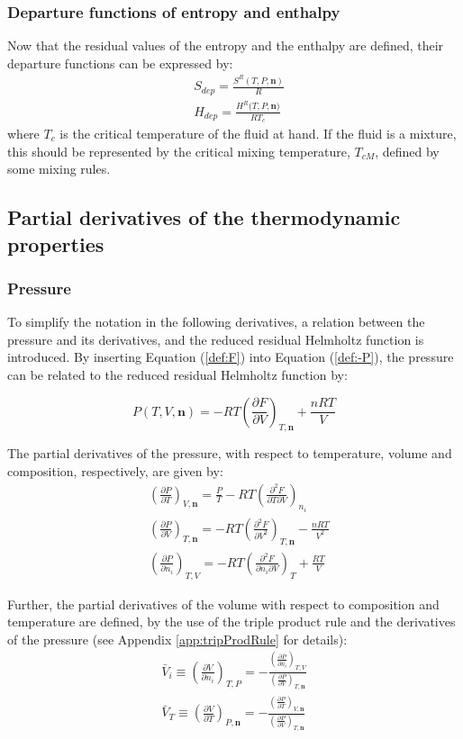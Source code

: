 \documentclass[internal,english]{sintefmemo2012}
\numberwithin{equation}{section}
\newcommand*{\pder}[2]{\left(\frac{\partial #1}{\partial #2}\right)}
\newcommand*{\pdder}[2]{\left(\frac{\partial^2 #1}{\partial #2^2}\right)}
\newcommand*{\pdcross}[3]{\left(\frac{\partial^2 #1}{\partial #2 \partial #3}\right)}
\newcommand*{\reff}[1]{(\ref{#1})}
\begin{document}
\subsubsection*{Departure functions of entropy and enthalpy}
Now that the residual values of the entropy and the enthalpy are defined, their departure functions can be expressed by:
\begin{align}
& S_{dep} = \frac{S^R(T,P,\textbf{n})}{R} \\
& H_{dep} = \frac{H^R(T,P,\textbf{n)}}{R T_c}
\end{align}
where $T_c$ is the critical temperature of the fluid at hand. If the fluid is a mixture, this should be represented by the critical mixing temperature, $T_{cM}$, defined by some mixing rules.
\subsection{Partial derivatives of the thermodynamic properties}

\subsubsection*{Pressure}
To simplify the notation in the following derivatives, a relation between the pressure and its derivatives, and the reduced residual Helmholtz function is introduced. By inserting Equation \reff{def:F} into Equation \reff{def:-P}, the pressure can be related to the reduced residual Helmholtz function by:

\begin{equation}
\label{def:P}
P(T,V,\textbf{n}) = -RT \left( \frac{\partial F}{\partial V} \right)_{T, \textbf{n}} + \frac{nRT}{V}
\end{equation}

The partial derivatives of the pressure, with respect to temperature, volume and composition, respectively, are given by:
\begin{align}
\label{eq:P_T}
& \pder{P}{T}_{V, \textbf{n}} = \frac{P}{T} - RT \pdcross{F}{T}{V}_{n_i} \\
\label{eq:P_V}
& \pder{P}{V}_{T, \textbf{n}} = -RT \pdder{F}{V}_{T, \textbf{n}} - \frac{nRT}{V^2} \\
\label{eq:P_i}
& \pder{P}{n_i}_{T,V} = -RT \pdcross{F}{n_i}{V}_T + \frac{RT}{V}
\end{align}

Further, the partial derivatives of the volume with respect to composition and temperature are defined, by the use of the triple product rule and the derivatives of the pressure (see Appendix \ref{app:tripProdRule} for details):
\begin{align}
\label{def:V_i}
\bar{V}_i \equiv \pder{V}{n_i}_{T,P} =  - \frac{\pder{P}{n_i}_{T,V}}{\pder{P}{V}_{T,\textbf{n}}} \\
\label{def:V_T}
\bar{V}_T \equiv \pder{V}{T}_{P,\textbf{n}} =  - \frac{\pder{P}{T}_{V,\textbf{n}}}{\pder{P}{V}_{T,\textbf{n}}}
\end{align}
\end{document}
